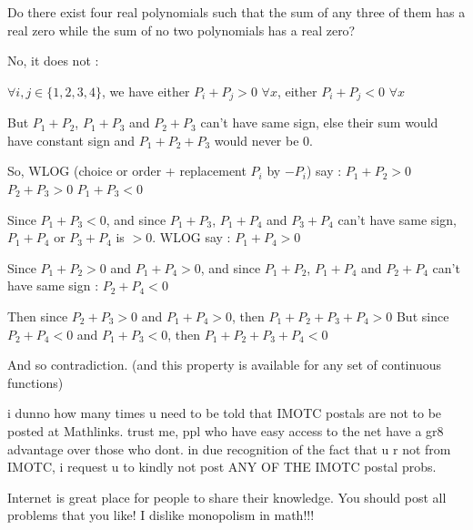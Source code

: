 \begin{solution}
	\begin{tcolorbox}Do there exist four real polynomials such that the sum of any three of them has a real zero while the sum of no two polynomials has a real zero?\end{tcolorbox}

No, it does not :

$ \forall i,j\in\{1,2,3,4\}$, we have either $ P_{i}+P_{j}> 0$ $ \forall x$, either $ P_{i}+P_{j}< 0$ $ \forall x$

But $ P_{1}+P_{2}$, $ P_{1}+P_{3}$ and $ P_{2}+P_{3}$ can't have same sign, else their sum would have constant sign and $ P_{1}+P_{2}+P_{3}$ would never be 0.

So, WLOG (choice or order + replacement $ P_{i}$ by $ -P_{i}$) say :
$ P_{1}+P_{2}> 0$
$ P_{2}+P_{3}> 0$
$ P_{1}+P_{3}< 0$

Since $ P_{1}+P_{3}< 0$, and since $ P_{1}+P_{3}$, $ P_{1}+P_{4}$ and $ P_{3}+P_{4}$ can't have same sign, $ P_{1}+P_{4}$ or $ P_{3}+P_{4}$ is $ > 0$. WLOG say :
$ P_{1}+P_{4}> 0$

Since $ P_{1}+P_{2}> 0$ and $ P_{1}+P_{4}> 0$, and since $ P_{1}+P_{2}$, $ P_{1}+P_{4}$ and $ P_{2}+P_{4}$ can't have same sign :
$ P_{2}+P_{4}< 0$

Then since $ P_{2}+P_{3}> 0$ and $ P_{1}+P_{4}> 0$, then $ P_{1}+P_{2}+P_{3}+P_{4}> 0$
But since $ P_{2}+P_{4}< 0$ and $ P_{1}+P_{3}< 0$, then $ P_{1}+P_{2}+P_{3}+P_{4}< 0$

And so contradiction.
(and this property is available for any set of continuous functions)
\end{solution}



\begin{solution}
	i dunno how many times u need to be told that IMOTC postals are not to be posted at Mathlinks.
trust me, ppl who have easy access to the net have a gr8 advantage over those who dont.
in due recognition of the fact that u r not from IMOTC, i request u to kindly not post ANY OF THE IMOTC postal probs.
\end{solution}



\begin{solution}
	Internet is great place for people to share their knowledge. You should post all problems that you like! I dislike monopolism in math!!!
\end{solution}



